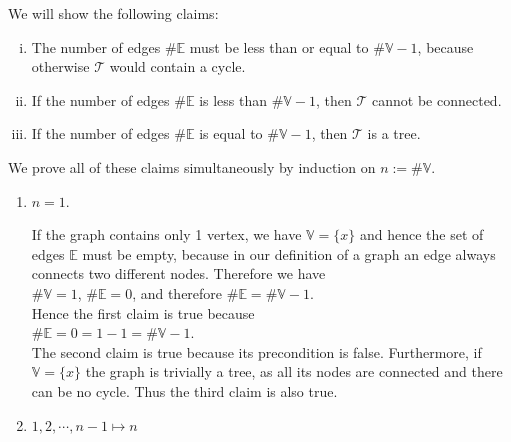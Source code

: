 \proof
We will show the following claims:
\begin{enumerate}[(i)]
\item The number of edges $\# \mathbb{E}$ must be less than or equal to $\#\mathbb{V}-1$, because otherwise $\mathcal{T}$ would contain a cycle.
\item If the number of edges $\# \mathbb{E}$ is less than  $\#\mathbb{V}-1$, then $\mathcal{T}$ cannot be connected.
\item If the number of edges $\# \mathbb{E}$ is equal to $\#\mathbb{V} - 1$, then $\mathcal{T}$ is a tree.
\end{enumerate}
We prove all of these claims simultaneously by induction on $n := \#\mathbb{V}$.
\begin{enumerate}
\item[B.C.:] $n = 1$.

  If the graph contains only 1 vertex, we have $\mathbb{V} = \{x\}$ and hence the set of edges $\mathbb{E}$
  must be empty, because in our definition of a graph an edge always connects two different nodes. Therefore we
  have 
  \\[0.2cm]
  \hspace*{1.3cm}
  $\#\mathbb{V} = 1$, \quad $\#\mathbb{E} = 0$, \quad and therefore \quad $\#\mathbb{E} = \#\mathbb{V}-1$.
  \\[0.2cm]
  Hence the first claim is true because
  \\[0.2cm]
  \hspace*{1.3cm}
  $\#\mathbb{E} = 0 = 1 - 1 = \#\mathbb{V} - 1$.
  \\[0.2cm]
  The second claim is true because its precondition is false.
  Furthermore, if $\mathbb{V} = \{x\}$  the graph is trivially a tree, as all its nodes are connected and there
  can be no cycle.   Thus the third claim is also true.
\item[I.S.:] $1, 2, \cdots, n-1 \mapsto n$


\end{enumerate}
